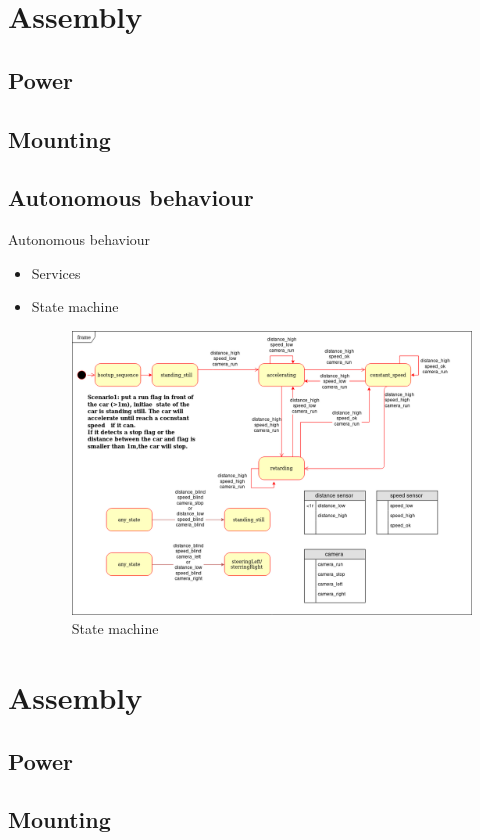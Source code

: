 \documentclass{beamer}
\begin{document}
\section{Assembly}
\subsection{Power}
\subsection{Mounting}


\subsection{Autonomous behaviour}
\begin{frame}{Autonomous behaviour}
 \begin{itemize}
  \item Services
  \item State machine
  \begin{figure}
    \includegraphics[width=0.7\linewidth]{statemachine.png}
    \caption{State machine}
  \end{figure}
 \end{itemize}

\end{frame}

\section{Assembly}
\subsection{Power}
\subsection{Mounting}
\end{document}
